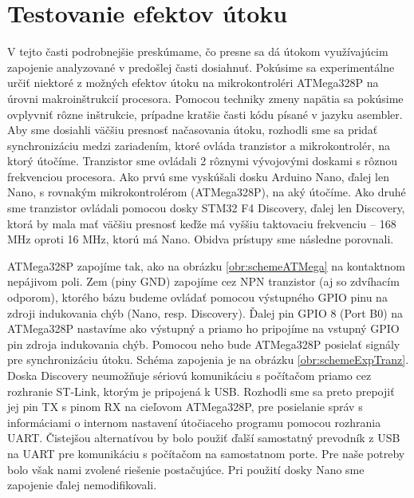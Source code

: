 \section{Testovanie efektov útoku}
V tejto časti podrobnejšie preskúmame, čo presne sa dá útokom využívajúcim zapojenie analyzované v predošlej časti dosiahnuť. Pokúsime sa experimentálne určiť niektoré z možných efektov útoku na mikrokontroléri ATMega328P na úrovni makroinštrukcií procesora. Pomocou techniky zmeny napätia sa pokúsime ovplyvniť rôzne inštrukcie, prípadne kratšie časti kódu písané v jazyku asembler. Aby sme dosiahli väčšiu presnosť načasovania útoku, rozhodli sme sa pridať synchronizáciu medzi zariadením, ktoré ovláda tranzistor a mikrokontrolér, na ktorý útočíme. Tranzistor sme ovládali 2 rôznymi vývojovými doskami s rôznou frekvenciou procesora. Ako prvú sme vyskúšali dosku Arduino Nano, ďalej len Nano, s rovnakým mikrokontrolérom (ATMega328P), na aký útočíme. Ako druhé sme tranzistor ovládali pomocou dosky STM32 F4 Discovery, ďalej len Discovery, ktorá by mala mať väčšiu presnosť keďže má vyššiu taktovaciu frekvenciu -- 168 MHz oproti 16 MHz, ktorú má Nano. Obidva prístupy sme následne porovnali.

ATMega328P zapojíme tak, ako na obrázku \ref{obr:schemeATMega} na kontaktnom nepájivom poli. Zem (piny GND) zapojíme cez NPN tranzistor (aj so zdvíhacím odporom), ktorého bázu budeme ovládať pomocou výstupného GPIO pinu na zdroji indukovania chýb (Nano, resp. Discovery). Ďalej pin GPIO 8 (Port B0) na ATMega328P nastavíme ako výstupný a priamo ho pripojíme na vstupný GPIO pin zdroja indukovania chýb. Pomocou neho bude ATMega328P posielať signály pre synchronizáciu útoku. Schéma zapojenia je na obrázku \ref{obr:schemeExpTranz}. Doska Discovery neumožňuje sériovú komunikáciu s počítačom priamo cez rozhranie ST-Link, ktorým je pripojená k USB. Rozhodli sme sa preto prepojiť jej pin TX s pinom RX na cieľovom ATMega328P, pre posielanie správ s informáciami o internom nastavení útočiaceho programu pomocou rozhrania UART. Čistejšou alternatívou by bolo použiť ďalší samostatný prevodník z USB na UART pre komunikáciu s počítačom na samostatnom porte. Pre naše potreby bolo však nami zvolené riešenie postačujúce. Pri použití dosky Nano sme zapojenie ďalej nemodifikovali.

